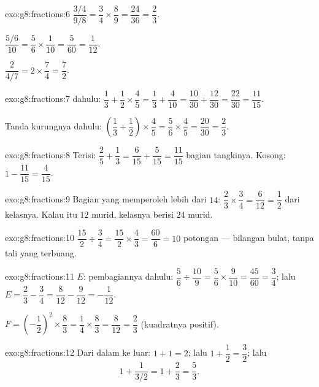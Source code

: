 \begin{solution}{exo:g8:fractions:6}
$\dfrac{3/4}{9/8} = \dfrac34 \times \dfrac89 = \dfrac{24}{36} =
\dfrac23$.

$\dfrac{5/6}{10} = \dfrac56 \times \dfrac{1}{10} = \dfrac{5}{60} =
\dfrac{1}{12}$.

$\dfrac{2}{4/7} = 2 \times \dfrac74 = \dfrac72$.
\end{solution}

\begin{solution}{exo:g8:fractions:7}
 dahulu:
$\dfrac13 + \dfrac12 \times \dfrac45 = \dfrac13 + \dfrac{4}{10}
= \dfrac{10}{30} + \dfrac{12}{30} = \dfrac{22}{30} = \dfrac{11}{15}$.

Tanda kurungnya dahulu:
$\left(\dfrac13 + \dfrac12\right) \times \dfrac45
= \dfrac56 \times \dfrac45 = \dfrac{20}{30} = \dfrac23$.
\end{solution}

\begin{solution}{exo:g8:fractions:8}
Terisi: $\dfrac25 + \dfrac13 = \dfrac{6}{15} + \dfrac{5}{15} =
\dfrac{11}{15}$ bagian tangkinya. Kosong:
$1 - \dfrac{11}{15} = \dfrac{4}{15}$.
\end{solution}

\begin{solution}{exo:g8:fractions:9}
Bagian yang memperoleh lebih dari $14$:
$\dfrac23 \times \dfrac34 = \dfrac{6}{12} = \dfrac12$ dari kelasnya.
Kalau itu $12$ murid, kelasnya berisi $24$ murid.
\end{solution}

\begin{solution}{exo:g8:fractions:10}
$\dfrac{15}{2} \div \dfrac34 = \dfrac{15}{2} \times \dfrac43
= \dfrac{60}{6} = 10$ potongan --- bilangan bulat, tanpa tali yang terbuang.
\end{solution}

\begin{solution}{exo:g8:fractions:11}
$E$: pembagiannya dahulu:
$\dfrac56 \div \dfrac{10}{9} = \dfrac56 \times \dfrac{9}{10}
= \dfrac{45}{60} = \dfrac34$; lalu
$E = \dfrac23 - \dfrac34 = \dfrac{8}{12} - \dfrac{9}{12} =
-\dfrac{1}{12}$.

$F = \left(-\dfrac12\right)^2 \times \dfrac83 = \dfrac14 \times
\dfrac83 = \dfrac{8}{12} = \dfrac23$ (kuadratnya positif).
\end{solution}

\begin{solution}{exo:g8:fractions:12}
Dari dalam ke luar: $1 + 1 = 2$; lalu
$1 + \dfrac12 = \dfrac32$; lalu
\[
1 + \frac{1}{3/2} = 1 + \frac23 = \frac53 .
\]
\end{solution}

